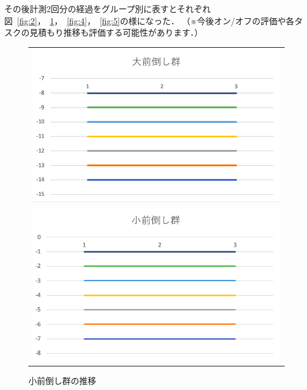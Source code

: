 その後計測2回分の経過をグループ別に表すとそれぞれ図~\ref{fig:2}，~\ref{fig:3}，~\ref{fig:4}，~\ref{fig:5}の様になった．
（※今後オン/オフの評価や各タスクの見積もり推移も評価する可能性があります．）

\begin{figure}[htb]
\begin{center}
\begin{tabular}{c}

  \begin{minipage}[htb]{\linewidth}
  \begin{center}
  \includegraphics[width=12cm]{images/7/2.png}
  \caption{大前倒し群の推移}
  \label{fig:2}
  \end{center}
  \end{minipage}
  
  \\
  
  \begin{minipage}[htb]{\linewidth}
  \begin{center}
  \includegraphics[width=12cm]{images/7/3.png}
  \caption{小前倒し群の推移}
  \label{fig:3}
  \end{center}
  \end{minipage}

\end{tabular}
\end{center}
\end{figure}

